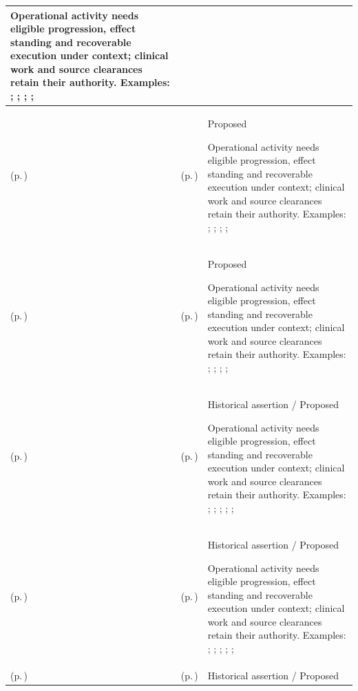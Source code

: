 \begin{longtable}{|>{\raggedright\arraybackslash}p{0.27\TableWidth}|>{\raggedright\arraybackslash}p{0.27\TableWidth}|>{\raggedright\arraybackslash}p{0.46\TableWidth}|}
Operational activity needs eligible progression, effect standing and recoverable execution under context; clinical work and source clearances retain their authority. Examples: \nameref{feature:feat-hso-27}; \nameref{feature:feat-hso-28}; \nameref{feature:feat-hso-29}; \nameref{function:manage-discharge-coordination-progression}; \nameref{service:discharge-readiness-telemetry}\\\hline
\nameref{cap:bec-discharge-management} (p.\,\pageref{cap:bec-discharge-management}) & \nameref{cap:ec-10} (p.\,\pageref{cap:ec-10}) & Proposed

Operational activity needs eligible progression, effect standing and recoverable execution under context; clinical work and source clearances retain their authority. Examples: \nameref{feature:feat-hso-27}; \nameref{feature:feat-hso-28}; \nameref{feature:feat-hso-29}; \nameref{function:manage-discharge-coordination-progression}; \nameref{service:discharge-readiness-telemetry}\\\hline
\nameref{cap:bec-discharge-management} (p.\,\pageref{cap:bec-discharge-management}) & \nameref{cap:ec-12} (p.\,\pageref{cap:ec-12}) & Proposed

Operational activity needs eligible progression, effect standing and recoverable execution under context; clinical work and source clearances retain their authority. Examples: \nameref{feature:feat-hso-27}; \nameref{feature:feat-hso-28}; \nameref{feature:feat-hso-29}; \nameref{function:manage-discharge-coordination-progression}; \nameref{service:discharge-readiness-telemetry}\\\hline
\nameref{cap:bec-workflow-activity-coordination} (p.\,\pageref{cap:bec-workflow-activity-coordination}) & \nameref{cap:ec-02} (p.\,\pageref{cap:ec-02}) & Historical assertion / Proposed

Operational activity needs eligible progression, effect standing and recoverable execution under context; clinical work and source clearances retain their authority. Examples: \nameref{feature:feat-ise-20}; \nameref{feature:feat-ise-21}; \nameref{feature:feat-ise-22}; \nameref{feature:feat-ise-23}; \nameref{function:coordinate-work-order}; \nameref{service:work-order-coordination-service}\\\hline
\nameref{cap:bec-workflow-activity-coordination} (p.\,\pageref{cap:bec-workflow-activity-coordination}) & \nameref{cap:ec-10} (p.\,\pageref{cap:ec-10}) & Historical assertion / Proposed

Operational activity needs eligible progression, effect standing and recoverable execution under context; clinical work and source clearances retain their authority. Examples: \nameref{feature:feat-ise-20}; \nameref{feature:feat-ise-21}; \nameref{feature:feat-ise-22}; \nameref{feature:feat-ise-23}; \nameref{function:coordinate-work-order}; \nameref{service:work-order-coordination-service}\\\hline
\nameref{cap:bec-workflow-activity-coordination} (p.\,\pageref{cap:bec-workflow-activity-coordination}) & \nameref{cap:ec-12} (p.\,\pageref{cap:ec-12}) & Historical assertion / Proposed


\end{longtable}
